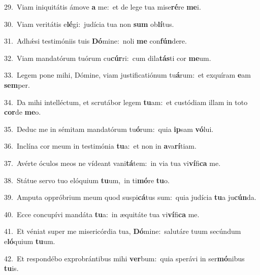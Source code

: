 {\numbfont\textcolor{\numbcolor}{29.}}~Viam iniquitátis ámove \textbf{a} me:~\star et de lege tua mise\-\textbf{ré}\-re \textbf{me}\-i.\par
{\numbfont\textcolor{\numbcolor}{30.}}~Viam veritátis e\-\textbf{lé}\-gi:~\star judícia tua non \textbf{sum} ob\-\textbf{lí}\-tus.\par
{\numbfont\textcolor{\numbcolor}{31.}}~Adhǽsi testimóniis tuis \textbf{Dó}\-mine:~\star noli \textbf{me} con\-\textbf{fún}\-dere.\par
{\numbfont\textcolor{\numbcolor}{32.}}~Viam mandatórum tuórum cu\-\textbf{cúr}\-ri:~\star cum dila\-\textbf{tás}\-ti cor \textbf{me}\-um.\par
{\numbfont\textcolor{\numbcolor}{33.}}~Legem pone mihi, Dómine, viam justificatiónum tu\-\textbf{á}\-rum:~\star et exquíram \textbf{e}\-am \textbf{sem}\-per.\par
{\numbfont\textcolor{\numbcolor}{34.}}~Da mihi intelléctum, et scrutábor legem \textbf{tu}\-am:~\star et custódiam illam in toto \textbf{cor}\-de \textbf{me}\-o.\par
{\numbfont\textcolor{\numbcolor}{35.}}~Deduc me in sémitam mandatórum tu\-\textbf{ó}\-rum:~\star quia \textbf{ip}\-sam \textbf{vó}\-lui.\par
{\numbfont\textcolor{\numbcolor}{36.}}~Inclína cor meum in testimónia \textbf{tu}\-a:~\star et non in \textbf{a}\-va\-\textbf{rí}\-tiam.\par
{\numbfont\textcolor{\numbcolor}{37.}}~Avérte óculos meos ne vídeant vani\-\textbf{tá}\-tem:~\star in via tua vi\-\textbf{ví}\-fi\textbf{ca} me.\par
{\numbfont\textcolor{\numbcolor}{38.}}~Státue servo tuo elóquium \textbf{tu}\-um,~\star in ti\-\textbf{mó}\-re \textbf{tu}\-o.\par
{\numbfont\textcolor{\numbcolor}{39.}}~Amputa oppróbrium meum quod suspi\-\textbf{cá}\-tus sum:~\star quia judícia \textbf{tu}\-a ju\-\textbf{cún}\-da.\par
{\numbfont\textcolor{\numbcolor}{40.}}~Ecce concupívi mandáta \textbf{tu}\-a:~\star in æquitáte tua vi\-\textbf{ví}\-fi\textbf{ca} me.\par
{\numbfont\textcolor{\numbcolor}{41.}}~Et véniat super me misericórdia tua, \textbf{Dó}\-mine:~\star salutáre tuum secúndum e\-\textbf{ló}\-quium \textbf{tu}\-um.\par
{\numbfont\textcolor{\numbcolor}{42.}}~Et respondébo exprobrántibus mihi \textbf{ver}\-bum:~\star quia sperávi in ser\-\textbf{mó}\-nibus \textbf{tu}\-is.\par
